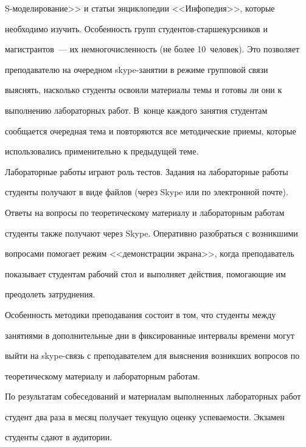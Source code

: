   S-мо\-де\-ли\-ро\-ва\-ние>> и статьи энциклопедии <<Инфопедия>>, которые


необходимо изучить. Особенность групп сту\-ден\-тов-стар\-ше\-курс\-ни\-ков и


магистрантов~--- их немногочисленность (не более 10~человек). Это позволяет


преподавателю на очередном skype-за\-ня\-тии в режиме групповой связи


выяснять, насколько студенты освоили материалы темы и готовы ли они к


выполнению лабораторных работ. В~конце каждого занятия студентам


сообщается очередная тема и повторяются все методические приемы, которые


использовались применительно к предыдущей теме.





  Лабораторные работы играют роль тестов. Задания на лабораторные работы


студенты получают в виде файлов (через Skype или по электронной почте).


Ответы на вопросы по теоретическому материалу и лабораторным работам


студенты также получают через Skype. Оперативно разобраться с возникшими


вопросами помогает режим <<демонстрации экрана>>, когда преподаватель


показывает студентам рабочий стол и выполняет действия, помогающие им


преодолеть затруднения.





  Особенность методики преподавания состоит в том, что студенты между


занятиями в дополнительные дни в фиксированные интервалы времени могут


выйти на skype-связь с преподавателем для выяснения возникших вопросов по


теоретическому материалу и лабораторным работам.





  По результатам собеседований и материалам выполненных лабораторных работ


студент два раза в месяц получает текущую оценку успеваемости. Экзамен


студенты сдают в аудитории.





